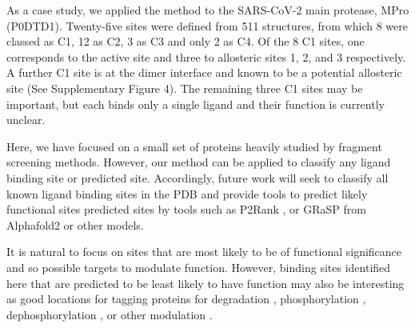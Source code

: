 As a case study, we applied the method to the SARS-CoV-2 main protease, MPro (P0DTD1). Twenty-five sites were defined from 511 structures, from which 8 were classed as C1, 12 as C2, 3 as C3 and only 2 as C4. Of the 8 C1 sites, one corresponds to the active site and three to allosteric sites 1, 2, and 3 \cite{DASGUPTA_2022_ALLOSTERIC} respectively. A further C1 site  is at the dimer interface and known to be a potential allosteric site \cite{DOUANGAMATH_2020_SARSCOV2} (See Supplementary Figure 4). The remaining three C1 sites may be important, but each binds only a single ligand and their function is currently unclear.

Here, we have focused on a small set of proteins heavily studied by fragment screening methods. However, our method can be applied to classify any ligand binding site or predicted site. Accordingly, future work will seek to classify all known ligand binding sites in the PDB and provide tools to predict likely functional sites predicted sites by tools such as P2Rank \cite{KRIVAK_2018_P2RANK}, or GRaSP \cite{SANTANA_2020_GRaSP} from Alphafold2 \cite{JUMPER_2021_ALPHAFOLD, VARADI_2022_ALPHAFOLDDB} or other models.

It is natural to focus on sites that are most likely to be of functional significance and so possible targets to modulate function. However, binding sites identified here that are predicted to be least likely to have function may also be interesting as good locations for tagging proteins for degradation \cite{BEKES_2022_PROTACS}, phosphorylation \cite{SIRIWARDENA_2020_PHOSPHO}, dephosphorylation \cite{SIMPSON_2023_ADPROM}, or other modulation \cite{HEITEL_2023_PTMS, PENG_2023_PTMS}.